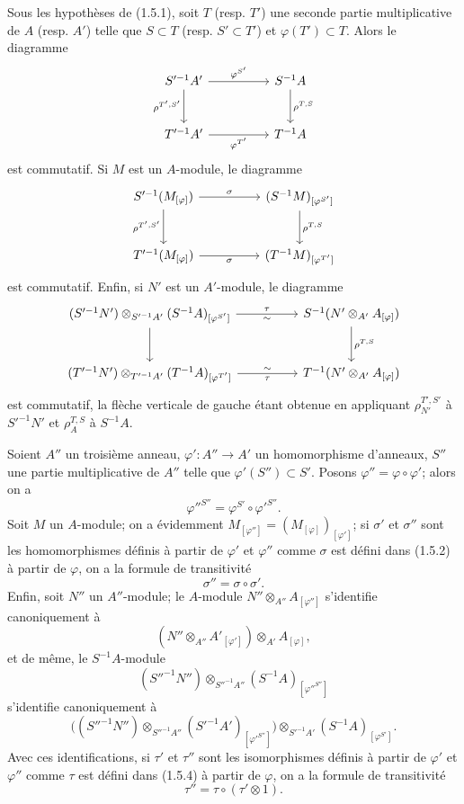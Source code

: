 \begin{env}[1.5.6]
\label{0.1.5.6-fr}
Sous les hypothèses de (1.5.1), soit $T$ (resp. $T'$) une seconde partie
multiplicative de $A$ (resp. $A'$) telle que $S\subset T$ (resp. $S'\subset T'$)
et $\varphi(T')\subset T$. Alors le diagramme
\[
\begin{tikzcd}[column sep=huge,row sep=large]
S'^{-1}A' \arrow[r,"\varphi^{S'}"] \arrow[d,"\rho^{T',S'}"']
  & S^{-1}A \arrow[d,"\rho^{T,S}"] \\
T'^{-1}A' \arrow[r,"\varphi^{T'}"']
  & T^{-1}A
\end{tikzcd}
\]
est commutatif. Si $M$ est un $A$-module, le diagramme
\[
\begin{tikzcd}[column sep=huge,row sep=large]
S'^{-1}(M_{[\varphi]}) \arrow[r,"\sigma"] \arrow[d,"\rho^{T',S'}"']
  & (S^{-1}M)_{[\varphi^{S'}]} \arrow[d,"\rho^{T,S}"] \\
T'^{-1}(M_{[\varphi]}) \arrow[r,"\sigma"']
  & (T^{-1}M)_{[\varphi^{T'}]}
\end{tikzcd}
\]
est commutatif. Enfin, si $N'$ est un $A'$-module, le diagramme
\[
\begin{tikzcd}[column sep=huge,row sep=large]
(S'^{-1}N')\otimes_{S'^{-1}A'}(S^{-1}A)_{[\varphi^{S'}]}
  \arrow[r,"\tau","{\sim}"'] \arrow[d]
  & S^{-1}(N'\otimes_{A'}A_{[\varphi]}) \arrow[d,"\rho^{T,S}"] \\
(T'^{-1}N')\otimes_{T'^{-1}A'}(T^{-1}A)_{[\varphi^{T'}]}
  \arrow[r,"\tau"',"{\sim}"]
  & T^{-1}(N'\otimes_{A'}A_{[\varphi]})
\end{tikzcd}
\]
est commutatif, la flèche verticale de gauche étant obtenue en appliquant
$\rho_{N'}^{T',S'}$ à $S'^{-1}N'$ et $\rho_A^{T,S}$ à $S^{-1}A$.
\end{env}


\begin{env}[1.5.7]
\label{0.1.5.7-fr}
Soient $A''$ un troisième anneau, $\varphi':A''\to A'$ un homomorphisme
d'anneaux, $S''$ une partie multiplicative de $A''$ telle que
$\varphi'(S'')\subset S'$. Posons $\varphi''=\varphi\circ\varphi'$; alors on a
\[
  \varphi''^{S''}=\varphi^{S'}\circ\varphi'^{S''}.
\]
Soit $M$ un $A$-module; on a évidemment
$M_{[\varphi'']}=(M_{[\varphi]})_{[\varphi']}$; si $\sigma'$ et $\sigma''$ sont
les homomorphismes définis à partir de $\varphi'$ et $\varphi''$ comme $\sigma$
est défini dans (1.5.2) à partir de $\varphi$, on a la formule de transitivité
\[
  \sigma''=\sigma\circ\sigma'.
\]
Enfin, soit $N''$ un $A''$-module; le $A$-module
$N''\otimes_{A''}A_{[\varphi'']}$ s'identifie canoniquement à
\[
  (N''\otimes_{A''}A'_{[\varphi']})\otimes_{A'}A_{[\varphi]},
\]
et de même, le $S^{-1}A$-module
\[
  (S''^{-1}N'')\otimes_{S''^{-1}A''}
  (S^{-1}A)_{[\varphi''^{S''}]}
\]
s'identifie canoniquement à
\[
  \bigl((S''^{-1}N'')\otimes_{S''^{-1}A''}
  (S'^{-1}A')_{[\varphi'^{S''}]}\bigr)
  \otimes_{S'^{-1}A'}(S^{-1}A)_{[\varphi^{S'}]}.
\]
Avec ces identifications, si $\tau'$ et $\tau''$ sont les isomorphismes définis
à partir de $\varphi'$ et $\varphi''$ comme $\tau$ est défini dans (1.5.4) à
partir de $\varphi$, on a la formule de transitivité
\[
  \tau''=\tau\circ(\tau'\otimes 1).
\]
\end{env}

